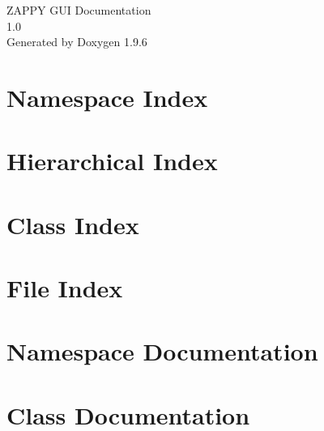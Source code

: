 \documentclass[twoside]{book}
\newcommand{\+}{\discretionary{\mbox{\scriptsize$\hookleftarrow$}}{}{}}
\newcommand{\clearemptydoublepage}{%
    \newpage{\pagestyle{empty}\cleardoublepage}%
  }
\begin{document}
  \raggedbottom
    \hypersetup{pageanchor=false,
                bookmarksnumbered=true,
                pdfencoding=unicode
               }
  \begin{titlepage}
  \vspace*{7cm}
  \begin{center}%
  {\Large ZAPPY GUI Documentation}\\
  [1ex]\large 1.\+0 \\
  \vspace*{1cm}
  {\large Generated by Doxygen 1.9.6}\\
  \end{center}
  \end{titlepage}
  \clearemptydoublepage
  \tableofcontents
  \clearemptydoublepage
  \hypersetup{pageanchor=true}
\chapter{Namespace Index}

\chapter{Hierarchical Index}

\chapter{Class Index}

\chapter{File Index}

\chapter{Namespace Documentation}


\chapter{Class Documentation}



























\end{document}
